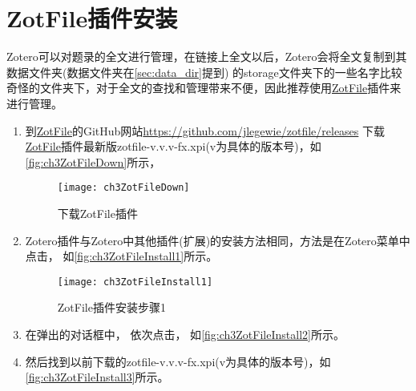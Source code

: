 \documentclass[cn,11pt,chinese]{elegantbook}
\begin{document}
		\section{ZotFile插件安装}\label{sec:ZotFileInstall}
		Zotero可以对题录的全文进行管理，在链接上全文以后，Zotero会将全文复制到其数据文件夹(数据文件夹在\cref{sec:data_dir}提到)
		的storage文件夹下的一些名字比较奇怪的文件夹下，对于全文的查找和管理带来不便，因此推荐使用\href{http://zotfile.com/}{ZotFile}插件来进行管理。
		\begin{enumerate}
			\item 到\href{http://zotfile.com/}{ZotFile}的GitHub网站\url{https://github.com/jlegewie/zotfile/releases}
			下载\href{http://zotfile.com/}{ZotFile}插件最新版zotfile-v.v.v-fx.xpi(v为具体的版本号)，如\autoref{fig:ch3ZotFileDown}所示，
			\begin{figure}
				\centering
				\texttt{[image: ch3ZotFileDown]}
				\caption{下载ZotFile插件}
				\label{fig:ch3ZotFileDown}
			\end{figure}
			
			\item
			Zotero插件与Zotero中其他插件(扩展)的安装方法相同，方法是在Zotero菜单中点击，
			如\autoref{fig:ch3ZotFileInstall1}所示。
			\begin{figure}[htbp]
				\centering
				\texttt{[image: ch3ZotFileInstall1]}
				\caption{ZotFile插件安装步骤1}
				\label{fig:ch3ZotFileInstall1}
			\end{figure}
			\item
			在弹出的对话框中，
			依次点击，
			如\autoref{fig:ch3ZotFileInstall2}所示。
			\item
			然后找到以前下载的zotfile-v.v.v-fx.xpi(v为具体的版本号)，如\autoref{fig:ch3ZotFileInstall3}所示。
			

\end{enumerate}
\end{document}
